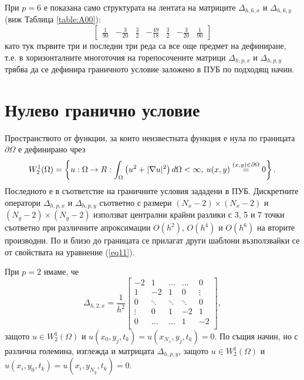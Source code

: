 \documentclass{article}
\newcommand{\be}{\begin{equation}}
\newcommand{\ee}{\end{equation}}
\newcommand{\rf}[1]{(\ref{#1})}
\begin{document}
При $p=6$ е показана само структурата на лентата на матриците $\Delta_{h,6,x}$ и $\Delta_{h,6,y}$ (виж Таблица \ref{table:A00}):
\[
\begin{bmatrix}
    \frac{1}{90}	& -\frac{3}{20}	& \frac{3}{2}         	& -\frac{49}{18}	&  \frac{3}{2}    	 &   -\frac{3}{20}	  &      \frac{1}{90}
\end{bmatrix}
\]
като тук първите три и последни три реда са все още предмет на дефиниране, т.е. в хоризонталните многоточия на горепосочените матрици $\Delta_{h,p,x}$ и $\Delta_{h,p,y}$ трябва да се дефинира граничното условие заложено в ПУБ по подходящ начин.

\section{Нулево гранично условие}
Пространството от функции, за които неизвестната функция е нула по границата $\partial\Omega$ е дефинирано чрез
\be\label{funSpace}
W_2^1(\Omega) =\left\{ u:\Omega \rightarrow \\R : \int_{\Omega} \left(u^2 + |\nabla u|^2 \right)d\Omega < \infty, \: u(x,y) \overset{(x, y) \in \partial\Omega}{=} 0 \right\}.
\ee
Последното е в съответстие на граничните условия зададени в ПУБ. Дискретните оператори $\Delta_{h,p,x}$ и $\Delta_{h,p,y}$ съответно с размери $(N_x-2) \times (N_x-2)$ и $(N_y-2)\times(N_y-2)$ използват централни крайни разлики с 3, 5 и 7 точки съответно при различните апроксимации $O(h^2)$, $O(h^4)$ и $O(h^6)$ на вторите производни. По и близо до границата се прилагат други шаблони възползвайки се от свойствата на уравнение \rf{eq11}. 

При $p=2$ имаме, че 
\[
\Delta_{h,2,x} = \frac{1}{h^2}
\begin{bmatrix}
    -2	       & 1        &     \dots   &   \dots        & 0   \\
    1               & -2            &   1           &   0               & \vdots    \\
        0           & \ddots        &    \ddots    &   \ddots       &  0 \\ 
    \vdots       &     0            &  1     	& -2    	   & 1 \\
    0               & \dots          &  \dots         & 1  	   & -2 \\
\end{bmatrix},
\]
защото $u \in W_2^1(\Omega)$ и $u(x_0, y_j, t_k) = u(x_{N_x}, y_j, t_k) = 0$. По същия начин, но с различна големина, изглежда и матрицата $\Delta_{h,p,y}$, защото $u \in W_2^1(\Omega)$ и $u(x_i, y_0, t_k) = u(x_i, y_{N_y}, t_k) = 0$. 
\end{document}
